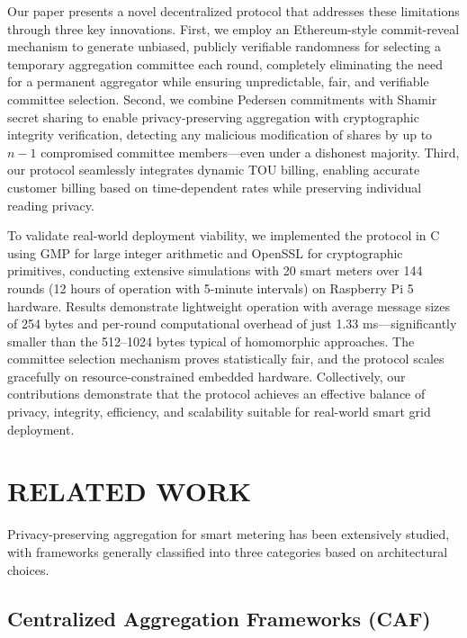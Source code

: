 \documentclass[conference]{IEEEtran}
\begin{document}
Our paper presents a novel decentralized protocol that addresses these limitations through three key innovations. First, we employ an Ethereum-style commit-reveal mechanism to generate unbiased, publicly verifiable randomness for selecting a temporary aggregation committee each round, completely eliminating the need for a permanent aggregator while ensuring unpredictable, fair, and verifiable committee selection. Second, we combine Pedersen commitments \cite{pedersen1991non} with Shamir secret sharing \cite{shamir1979how} to enable privacy-preserving aggregation with cryptographic integrity verification, detecting any malicious modification of shares by up to \(n-1\) compromised committee members—even under a dishonest majority. Third, our protocol seamlessly integrates dynamic TOU billing, enabling accurate customer billing based on time-dependent rates while preserving individual reading privacy.

To validate real-world deployment viability, we implemented the protocol in C using GMP for large integer arithmetic and OpenSSL for cryptographic primitives, conducting extensive simulations with 20 smart meters over 144 rounds (12 hours of operation with 5-minute intervals) on Raspberry Pi 5 hardware. Results demonstrate lightweight operation with average message sizes of 254 bytes and per-round computational overhead of just 1.33 ms—significantly smaller than the 512–1024 bytes typical of homomorphic approaches. The committee selection mechanism proves statistically fair, and the protocol scales gracefully on resource-constrained embedded hardware. Collectively, our contributions demonstrate that the protocol achieves an effective balance of privacy, integrity, efficiency, and scalability suitable for real-world smart grid deployment.

\section{RELATED WORK}

Privacy-preserving aggregation for smart metering has been extensively studied, with frameworks generally classified into three categories based on architectural choices.

\subsection{Centralized Aggregation Frameworks (CAF)}
\end{document}
